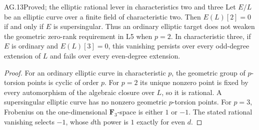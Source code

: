 \begin{claim}{AG.13}{Proved; the elliptic rational lever in characteristics two and three}
Let $E/L$ be an elliptic curve over a finite field of
characteristic two. Then $E(L)[2]=0$ if and only if $E$ is
supersingular. Thus an ordinary elliptic target does not
weaken the geometric zero-rank requirement in L5 when $p=2$.
In characteristic three, if $E$ is ordinary and $E(L)[3]=0$,
this vanishing persists over every odd-degree extension of
$L$ and fails over every even-degree extension.
\end{claim}
\begin{proof}
For an ordinary elliptic curve in characteristic $p$, the
geometric group of $p$-torsion points is cyclic of order $p$.
For $p=2$ its unique nonzero point is fixed by every
automorphism of the algebraic closure over $L$, so it is
rational. A supersingular elliptic curve has no nonzero
geometric $p$-torsion points. For $p=3$, Frobenius on the
one-dimensional $\mathbf F_3$-space is either $1$ or $-1$.
The stated rational vanishing selects $-1$, whose $d$th
power is $1$ exactly for even $d$.
\end{proof}

